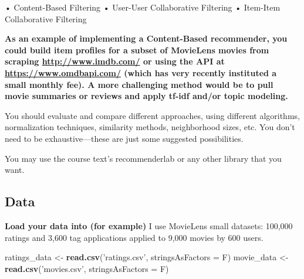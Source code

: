 \documentclass[]{article}
\newenvironment{Shaded}{\begin{snugshade}}{\end{snugshade}}
\newcommand{\CommentTok}[1]{\textcolor[rgb]{0.56,0.35,0.01}{\textit{#1}}}
\newcommand{\DataTypeTok}[1]{\textcolor[rgb]{0.13,0.29,0.53}{#1}}
\newcommand{\KeywordTok}[1]{\textcolor[rgb]{0.13,0.29,0.53}{\textbf{#1}}}
\newcommand{\NormalTok}[1]{#1}
\newcommand{\OperatorTok}[1]{\textcolor[rgb]{0.81,0.36,0.00}{\textbf{#1}}}
\newcommand{\StringTok}[1]{\textcolor[rgb]{0.31,0.60,0.02}{#1}}
\begin{document}
{ • Content-Based Filtering • User-User Collaborative Filtering •
Item-Item Collaborative Filtering }

\textbf{As an example of implementing a Content-Based recommender, you
could build item profiles for a subset of MovieLens movies from scraping
\url{http://www.imdb.com/} or using the API at
\url{https://www.omdbapi.com/} (which has very recently instituted a
small monthly fee). A more challenging method would be to pull movie
summaries or reviews and apply tf-idf and/or topic modeling.}

{ You should evaluate and compare different approaches, using different
algorithms, normalization techniques, similarity methods, neighborhood
sizes, etc. You don't need to be exhaustive---these are just some
suggested possibilities.}

{ You may use the course text's recommenderlab or any other library that
you want.}

\hypertarget{data}{%
\subsection{Data}\label{data}}

\textbf{Load your data into (for example)} { } { I use MovieLens small
datasets: 100,000 ratings and 3,600 tag applications applied to 9,000
movies by 600 users. }

\begin{Shaded}
\begin{Highlighting}[]
\NormalTok{ratings_data <-}\StringTok{ }\KeywordTok{read.csv}\NormalTok{(}\StringTok{'ratings.csv'}\NormalTok{, }\DataTypeTok{stringsAsFactors =}\NormalTok{ F)}
\NormalTok{movie_data <-}\StringTok{ }\KeywordTok{read.csv}\NormalTok{(}\StringTok{'movies.csv'}\NormalTok{, }\DataTypeTok{stringsAsFactors =}\NormalTok{ F)}
\end{Highlighting}
\end{Shaded}

\begin{Shaded}
\end{Shaded}
\end{document}
